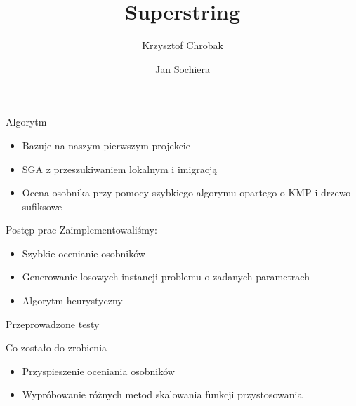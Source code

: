 \documentclass[10pt]{beamer}
\title{Superstring}
\author{Krzysztof Chrobak\and Jan Sochiera}
\institute{Algorytmy Ewolucyjne 2012/2013}
\begin{document}
\begin{frame}
\titlepage
\end{frame}

\begin{frame}{Algorytm}
\begin{itemize}
    \item <1-> Bazuje na naszym pierwszym projekcie
    \item <2-> SGA z przeszukiwaniem lokalnym i imigracją
    \item <3-> Ocena osobnika przy pomocy szybkiego algorymu opartego o KMP i drzewo sufiksowe
\end{itemize}
\end{frame}

\begin{frame}{Postęp prac}
Zaimplementowaliśmy:
\begin{itemize}
  \item <1-> Szybkie ocenianie osobników
  \item <2-> Generowanie losowych instancji problemu o zadanych parametrach
  \item <3-> Algorytm heurystyczny
\end{itemize}
\end{frame}

\begin{frame}{Przeprowadzone testy}
\end{frame}

\begin{frame}{Co zostało do zrobienia}
\begin{itemize}
  \item <1-> Przyspieszenie oceniania osobników
  \item <2-> Wypróbowanie różnych metod skalowania funkcji przystosowania
\end{itemize}
\end{frame}
\end{document}
